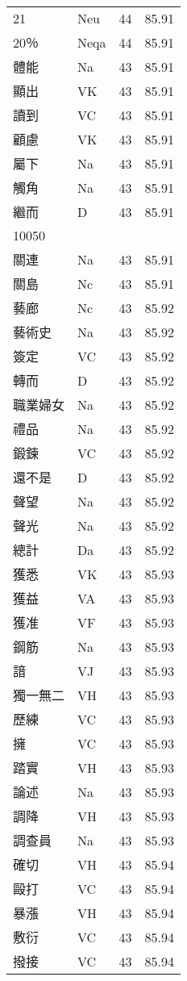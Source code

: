 \documentclass[twocolumn]{book}
\begin{document}
\begin{supertabular}{llrr}
21 & Neu & 44 &  85.91\\
20％ & Neqa & 44 &  85.91\\
體能 & Na & 43 &  85.91\\
顯出 & VK & 43 &  85.91\\
讀到 & VC & 43 &  85.91\\
顧慮 & VK & 43 &  85.91\\
屬下 & Na & 43 &  85.91\\
觸角 & Na & 43 &  85.91\\
繼而 & D & 43 &  85.91\\
10050\\
關連 & Na & 43 &  85.91\\
關島 & Nc & 43 &  85.91\\
藝廊 & Nc & 43 &  85.92\\
藝術史 & Na & 43 &  85.92\\
簽定 & VC & 43 &  85.92\\
轉而 & D & 43 &  85.92\\
職業婦女 & Na & 43 &  85.92\\
禮品 & Na & 43 &  85.92\\
鍛鍊 & VC & 43 &  85.92\\
還不是 & D & 43 &  85.92\\
聲望 & Na & 43 &  85.92\\
聲光 & Na & 43 &  85.92\\
總計 & Da & 43 &  85.92\\
獲悉 & VK & 43 &  85.93\\
獲益 & VA & 43 &  85.93\\
獲准 & VF & 43 &  85.93\\
鋼筋 & Na & 43 &  85.93\\
諳 & VJ & 43 &  85.93\\
獨一無二 & VH & 43 &  85.93\\
歷練 & VC & 43 &  85.93\\
擁 & VC & 43 &  85.93\\
踏實 & VH & 43 &  85.93\\
論述 & Na & 43 &  85.93\\
調降 & VH & 43 &  85.93\\
調查員 & Na & 43 &  85.93\\
確切 & VH & 43 &  85.94\\
毆打 & VC & 43 &  85.94\\
暴漲 & VH & 43 &  85.94\\
敷衍 & VC & 43 &  85.94\\
撥接 & VC & 43 &  85.94\\

\end{supertabular}
\end{document}
